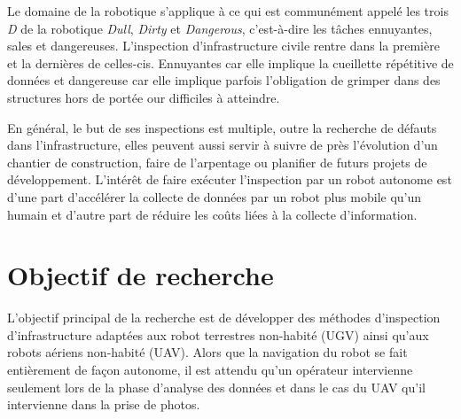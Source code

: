 \label{sec:Introduction}  %
Le domaine de la robotique s'applique à ce qui est communément appelé les trois \emph{D} de la robotique \emph{Dull}, \emph{Dirty} et \emph{Dangerous}, c'est-à-dire les tâches ennuyantes, sales et dangereuses. L'inspection d'infrastructure civile rentre dans la première et la dernières de celles-cis. Ennuyantes car elle implique la cueillette répétitive de données et dangereuse car elle implique parfois l'obligation de grimper dans des structures hors de portée our difficiles à atteindre.

En général, le but de ses inspections est multiple, outre la recherche de défauts dans l'infrastructure, elles peuvent aussi servir à suivre de près l'évolution d'un chantier de construction, faire de l'arpentage ou planifier de futurs projets de développement. L'intérêt de faire exécuter l'inspection par un robot autonome est d'une part d'accélérer la collecte de données par un robot plus mobile qu'un humain et d'autre part de réduire les coûts liées à la collecte d'information.



\section{Objectif de recherche}

L'objectif principal de la recherche est de développer des méthodes d'inspection d'infrastructure adaptées aux robot terrestres non-habité (UGV) ainsi qu'aux robots aériens non-habité (UAV). Alors que la navigation du robot se fait entièrement de façon autonome, il est attendu qu'un opérateur intervienne seulement lors de la phase d'analyse des données et dans le cas du UAV qu'il intervienne dans la prise de photos.

